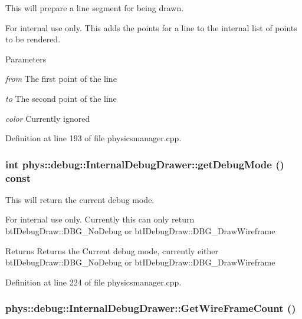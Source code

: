 This will prepare a line segment for being drawn. 

\begin{DoxyInternal}{For internal use only.}
This adds the points for a line to the internal list of points to be rendered. 
\begin{DoxyParams}{Parameters}
\item[{\em from}]The first point of the line \item[{\em to}]The second point of the line \item[{\em color}]Currently ignored \end{DoxyParams}
\end{DoxyInternal}


Definition at line 193 of file physicsmanager.cpp.

\hypertarget{classphys_1_1debug_1_1InternalDebugDrawer_aba329861569d741e970ce5aafb668e84}{
\subsubsection[{getDebugMode}]{\setlength{\rightskip}{0pt plus 5cm}int phys::debug::InternalDebugDrawer::getDebugMode () const}}
\label{db/d27/classphys_1_1debug_1_1InternalDebugDrawer_aba329861569d741e970ce5aafb668e84}


This will return the current debug mode. 

\begin{DoxyInternal}{For internal use only.}
Currently this can only return btIDebugDraw::DBG\_\-NoDebug or btIDebugDraw::DBG\_\-DrawWireframe \begin{DoxyReturn}{Returns}
Returns the Current debug mode, currently either btIDebugDraw::DBG\_\-NoDebug or btIDebugDraw::DBG\_\-DrawWireframe 
\end{DoxyReturn}
\end{DoxyInternal}


Definition at line 224 of file physicsmanager.cpp.

\hypertarget{classphys_1_1debug_1_1InternalDebugDrawer_aa1666e636e6ff81813c0b1a85d7bc157}{
\subsubsection[{GetWireFrameCount}]{ phys::debug::InternalDebugDrawer::GetWireFrameCount ()}}
\label{db/d27/classphys_1_1debug_1_1InternalDebugDrawer_aa1666e636e6ff81813c0b1a85d7bc157}


